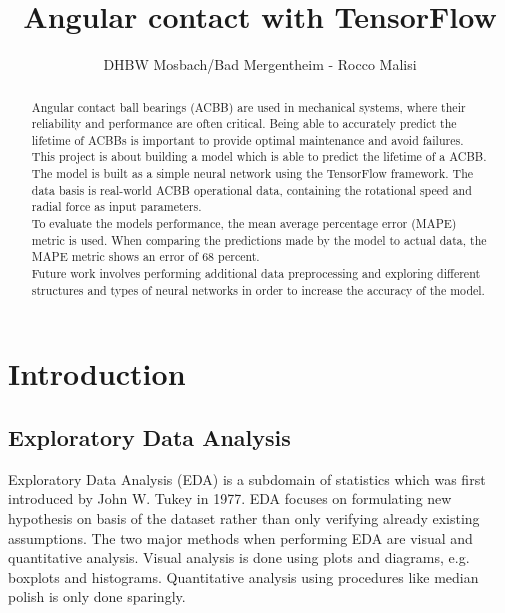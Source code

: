 \documentclass[letterpaper,10pt]{article}
\title{Angular contact with TensorFlow}
\author{DHBW Mosbach/Bad Mergentheim - Rocco Malisi}
\begin{document}
	\maketitle
	\newpage
		
	\begin{abstract}
	Angular contact ball bearings (ACBB) are used in mechanical systems, where their reliability and performance are often critical. Being able to accurately predict the lifetime of ACBBs is important to provide optimal maintenance and avoid failures. This project is about building a model which is able to predict the lifetime of a ACBB. 
	\\ The model is built as a simple neural network using the TensorFlow framework. The data basis is real-world ACBB operational data, containing the rotational speed and radial force as input parameters. 
	\\ To evaluate the models performance, the mean average percentage error (MAPE) metric is used. When comparing the predictions made by the model to actual data, the MAPE metric shows an error of 68 percent.
	\\ Future work involves performing additional data preprocessing and exploring different structures and types of neural networks in order to increase the accuracy of the model.
	
	\end{abstract}
	\newpage
	
	\tableofcontents
	\newpage
	
	\section{Introduction}
	\subsection{Exploratory Data Analysis}
	Exploratory Data Analysis (EDA) is a subdomain of statistics which was first introduced by John W. Tukey in 1977.\cite{tukey} EDA focuses on formulating new hypothesis on basis of the dataset rather than only verifying already existing assumptions. The two major methods when performing EDA are visual and quantitative analysis. Visual analysis is done using plots and diagrams, e.g. boxplots and histograms. Quantitative analysis using procedures like median polish is only done sparingly.
\end{document}
